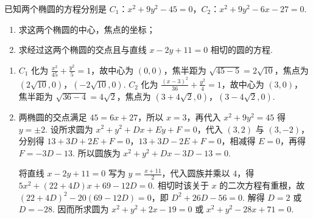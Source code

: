 \begin{problem}

已知两个椭圆的方程分别是 \(C_{1}\)：\(x^{2} + 9y^{2} - 45 = 0\)，\(C_{2}\)：\(x^{2} + 9y^{2} - 6x - 27 = 0\).

\begin{enumerate}
\item 求这两个椭圆的中心，焦点的坐标；
\item 求经过这两个椭圆的交点且与直线 \(x - 2y + 11 = 0\) 相切的圆的方程.
\end{enumerate}
\end{problem}

\begin{solution}
\begin{enumerate}
\item \(C_{1}\) 化为 \(\displaystyle\frac{x^{2}}{45}+\frac{y^{2}}{5}=1\)，故中心为 \((0,0)\)，焦半距为 \(\sqrt{45-5}=2\sqrt{10}\)，焦点为 \((2\sqrt{10},0)\)，\((-2\sqrt{10},0)\). \(C_{2}\) 化为 \(\displaystyle\frac{(x-3)^{2}}{36}+\frac{y^{2}}{4}=1\)，故中心为 \((3,0)\)，焦半距为 \(\sqrt{36-4}=4\sqrt{2}\)，焦点为 \((3+4\sqrt{2},0)\)，\((3-4\sqrt{2},0)\).
\item 两椭圆的交点满足 \(45=6x+27\)，所以 \(x=3\)，再代入 \(x^{2}+9y^{2}=45\) 得 \(y=\pm2\). 设所求圆为 \(x^{2}+y^{2}+Dx+Ey+F=0\)，代入 \((3,2)\) 与 \((3,-2)\)，分别得 \(13+3D+2E+F=0\)，\(13+3D-2E+F=0\)，相减得 \(E=0\)，再得 \(F=-3D-13\). 所以圆族为 \(x^{2}+y^{2}+Dx-3D-13=0\).

将直线 \(x-2y+11=0\) 写为 \(y=\frac{x+11}{2}\)，代入圆族并乘以 \(4\)，得 \(\displaystyle5x^{2}+(22+4D)x+69-12D=0\). 相切时该关于 \(x\) 的二次方程有重根，故 \(\displaystyle(22+4D)^{2}-20(69-12D)=0\)，即 \(D^{2}+26D-56=0\). 解得 \(D=2\) 或 \(D=-28\). 因而所求圆为 \(x^{2}+y^{2}+2x-19=0\) 或 \(x^{2}+y^{2}-28x+71=0\).
\end{enumerate}
\end{solution}

